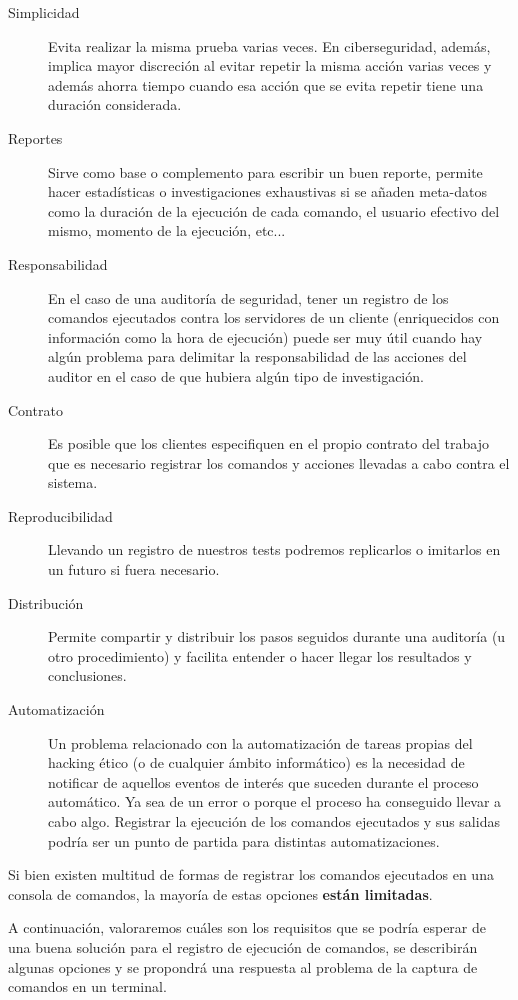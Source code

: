 \begin{description}
\item[Simplicidad] Evita realizar la misma prueba varias veces. En ciberseguridad, además, implica mayor discreción al evitar repetir la misma acción varias veces y además ahorra tiempo cuando esa acción que se evita repetir tiene una duración considerada.
\item[Reportes] Sirve como base o complemento para escribir un buen reporte, permite hacer estadísticas o investigaciones exhaustivas si se añaden meta-datos como la duración de la ejecución de cada comando, el usuario efectivo del mismo, momento de la ejecución, etc...
\item[Responsabilidad] En el caso de una auditoría de seguridad, tener un registro de los comandos ejecutados contra los servidores de un cliente (enriquecidos con información como la hora de ejecución) puede ser muy útil cuando hay algún problema para delimitar la responsabilidad de las acciones del auditor en el caso de que hubiera algún tipo de investigación.
\item[Contrato] Es posible que los clientes especifiquen en el propio contrato del trabajo que es necesario registrar los comandos y acciones llevadas a cabo contra el sistema.
\item[Reproducibilidad] Llevando un registro de nuestros tests podremos replicarlos o imitarlos en un futuro si fuera necesario. 
\item[Distribución] Permite compartir y distribuir los pasos seguidos durante una auditoría (u otro procedimiento) y facilita entender o hacer llegar los resultados y conclusiones.
\item[Automatización] Un problema relacionado con la automatización de tareas propias del hacking ético (o de cualquier ámbito informático) es la necesidad de notificar de aquellos eventos de interés que suceden durante el proceso automático. Ya sea de un error o porque el proceso ha conseguido llevar a cabo algo. Registrar la ejecución de los comandos ejecutados y sus salidas podría ser un punto de partida para distintas automatizaciones.
\end{description}
\label{razones_log}

Si bien existen multitud de formas de registrar los comandos ejecutados en una consola de comandos, la mayoría de estas opciones \textbf{están limitadas}. 

A continuación, valoraremos cuáles son los requisitos que se podría esperar de una buena solución para el registro de ejecución de comandos, se describirán algunas opciones y se propondrá una respuesta al problema de la captura de comandos en un terminal.

